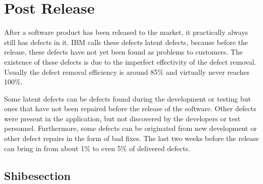 \section{Post Release}

After a software product has been released to the market, it practically always still has defects in it. IBM calls these defects latent defects, because before the release, these defects have not yet been found as problems to customers. The existence of these defects is due to the imperfect effectivity of the defect removal. Usually the defect removal efficiency is around 85\% and virtually never reaches 100\%.

Some latent defects can be defects found during the development or testing but ones that have not been repaired before the release of the software. Other defects were present in the application, but not discovered by the developers or test personnel. Furthermore, some defects can be originated from new development or other defect repairs in the form of bad fixes. The last two weeks before the release can bring in from about 1\% to even 5\% of delivered defects.


%
%
\subsection{Shibesection}